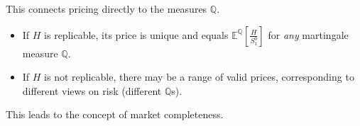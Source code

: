 This connects pricing directly to the measures $\mathbb{Q}$.
\begin{itemize}
    \item If $H$ is replicable, its price is unique and equals $\mathbb{E}^\mathbb{Q}[\frac{H}{S_1^0}]$ for \textit{any} martingale measure $\mathbb{Q}$.
    \item If $H$ is not replicable, there may be a range of valid prices, corresponding to different views on risk (different $\mathbb{Q}$s).
\end{itemize}

This leads to the concept of market completeness.
